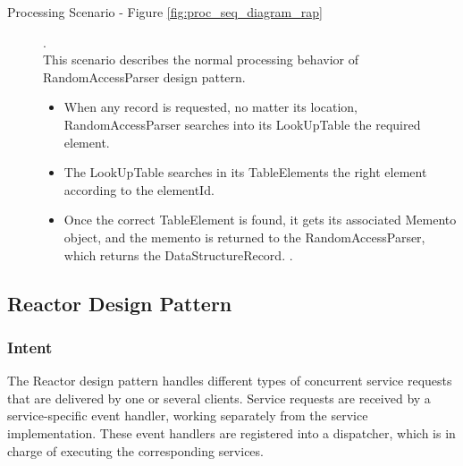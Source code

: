 
\begin{description}
	
	
	\item[Processing Scenario - Figure \ref{fig:proc_seq_diagram_rap} ].\\
	This scenario describes the normal processing behavior of RandomAccessParser design pattern.
	
	\begin{itemize}
		\item  When any record is requested, no matter its location, RandomAccessParser searches into its LookUpTable the required element.
		
		\item  The LookUpTable searches in its TableElements the right element according to the elementId.
		
		\item  Once the correct TableElement is found, it gets its associated Memento object, and the memento is returned to the RandomAccessParser, which returns the DataStructureRecord. .
	\end{itemize}
	
\end{description}

\subsection{Reactor Design Pattern}

\subsubsection{Intent}
The Reactor design pattern handles different types of concurrent service requests that are delivered by one or several clients. Service requests are received by a service-specific event handler, working separately from the service implementation. These event handlers are registered into a dispatcher, which is in charge of executing the corresponding services.


